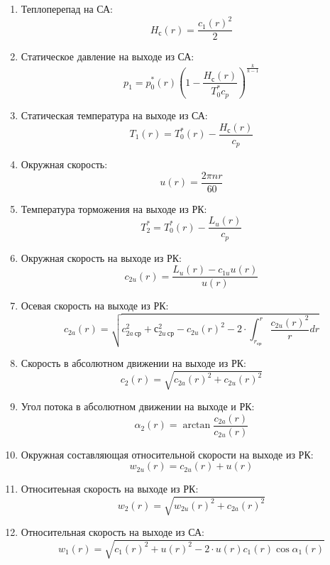 \documentclass[a4paper,12pt]{article}
\begin{document}
\begin{enumerate}
        \item Теплоперепад на СА:
        \[
            H_с (r) = \frac{c_1(r) ^ 2}{2}
        \]

        \item Статическое давление на выходе из СА:
        \[
            p_1 = p_0^*(r) \left( 1 - \frac{H_с (r)}{T_0^* c_p} \right) ^ {\frac{k}{k - 1}}
        \]

        \item Статическая температура на выходе из СА:
        \[
            T_1 (r) = T_0^*(r) - \frac{H_с (r)}{c_p}
        \]

        \item Окружная скорость:
        \[
            u(r) = \frac{2 \pi n r}{60}
        \]

        \item Температура торможения на выходе из РК:
        \[
            T_2^* = T_0^*(r) - \frac{L_u (r)}{c_p}
        \]

        \item Окружная скорость на выходе из РК:
        \[
            c_{2u}(r) = \frac{L_u(r) - c_{1u} u(r)}{u(r)}
        \]

        \item Осевая скорость на выходе из РК:
        \[
            c_{2a}(r) = \sqrt{
                    c_{2a\ ср}^2 + с_{2u\ ср}^2 - c_{2u}(r)^2 -
                    2 \cdot \int_{r_{ср}}^{r} \frac{c_{2u}(r)^2}{r} dr
            }
        \]

        \item Скорость в абсолютном движении на выходе из РК:
        \[
            c_2(r) = \sqrt{c_{2a}(r)^2 + c_{2u}(r)^2}
        \]

        \item Угол потока в абсолютном движении на выходе и РК:
        \[
            \alpha_2 (r) = \arctan{\frac{c_{2a}(r)}{c_{2u}(r)}}
        \]

        \item Окружная составляющая относительной скорости на выходе из РК:
        \[
            w_{2u}(r) = c_{2u}(r) + u(r)
        \]

        \item Относитеьная скорость на выходе из РК:
        \[
            w_2 (r) = \sqrt{w_{2u}(r)^2 + c_{2a}(r)^2}
        \]

        \item Относительная скорость на выходе из СА:
        \[
            w_1 (r) = \sqrt{c_1(r)^2 + u(r)^2 - 2 \cdot u(r) c_1(r) \cos{\alpha_1(r)}}
        \]


\end{enumerate}
\end{document}
